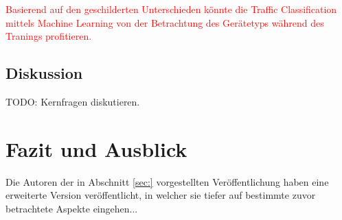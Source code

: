 \documentclass[12pt, a4paper]{article}
\begin{document}
\vfill
\pagebreak

\textcolor{red}{Basierend auf den geschilderten Unterschieden könnte die Traffic Classification mittels Machine Learning
von der Betrachtung des Gerätetyps während des Tranings profitieren.}
\newline\newline

\subsection{Diskussion}

TODO: Kernfragen diskutieren.

\pagebreak

\section{Fazit und Ausblick}

Die Autoren der in Abschnitt \ref{sec:} vorgestellten Veröffentlichung haben eine erweiterte Version veröffentlicht,
in welcher sie tiefer auf bestimmte zuvor betrachtete Aspekte eingehen...

\vfill
\pagebreak


%

\end{document}

